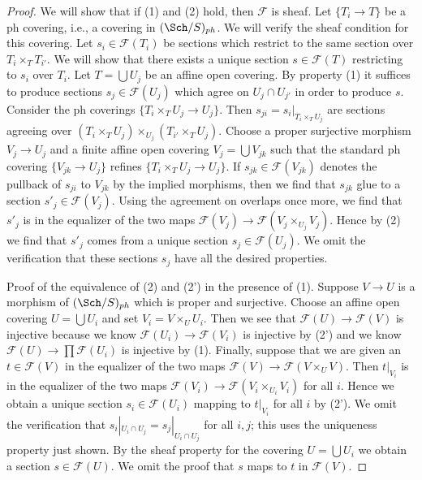 \begin{proof}
We will show that if (1) and (2) hold, then $\mathcal{F}$ is sheaf.
Let $\{T_i \to T\}$ be a ph covering, i.e., a covering in $(\Sch/S)_{ph}$.
We will verify the sheaf condition for this covering.
Let $s_i \in \mathcal{F}(T_i)$ be sections which restrict to the same
section over $T_i \times_T T_{i'}$. We will show that there exists a
unique section $s \in \mathcal{F}(T)$ restricting to $s_i$ over $T_i$.
Let $T = \bigcup U_j$ be an affine open covering.
By property (1) it suffices to produce sections $s_j \in \mathcal{F}(U_j)$
which agree on $U_j \cap U_{j'}$ in order to produce $s$.
Consider the ph coverings $\{T_i \times_T U_j \to U_j\}$.
Then $s_{ji} = s_i|_{T_i \times_T U_j}$ are sections agreeing
over $(T_i \times_T U_j) \times_{U_j} (T_{i'} \times_T U_j)$.
Choose a proper surjective morphism $V_j \to U_j$ and a finite affine
open covering $V_j = \bigcup V_{jk}$ such that the standard ph covering
$\{V_{jk} \to U_j\}$ refines $\{T_i \times_T U_j \to U_j\}$.
If $s_{jk} \in \mathcal{F}(V_{jk})$
denotes the pullback of $s_{ji}$ to $V_{jk}$ by the
implied morphisms, then we find that $s_{jk}$ glue to a section
$s'_j \in \mathcal{F}(V_j)$. Using the agreement on overlaps
once more, we find that $s'_j$ is in the equalizer of the two
maps $\mathcal{F}(V_j) \to \mathcal{F}(V_j \times_{U_j} V_j)$.
Hence by (2) we find that $s'_j$ comes from a unique section
$s_j \in \mathcal{F}(U_j)$. We omit the verification that these
sections $s_j$ have all the desired properties.

\medskip\noindent
Proof of the equivalence of (2) and (2') in the presence of (1).
Suppose $V \to U$ is a morphism of $(\Sch/S)_{ph}$ which is
proper and surjective. Choose an
affine open covering $U = \bigcup U_i$ and set $V_i = V \times_U U_i$.
Then we see that $\mathcal{F}(U) \to \mathcal{F}(V)$
is injective because we know $\mathcal{F}(U_i) \to \mathcal{F}(V_i)$
is injective by (2') and we know $\mathcal{F}(U) \to \prod \mathcal{F}(U_i)$
is injective by (1). Finally, suppose that we are given an
$t \in \mathcal{F}(V)$ in the equalizer of the two maps
$\mathcal{F}(V) \to \mathcal{F}(V \times_U V)$.
Then $t|_{V_i}$ is in the equalizer of the two maps
$\mathcal{F}(V_i) \to \mathcal{F}(V_i \times_{U_i} V_i)$
for all $i$. Hence we obtain a unique section $s_i \in \mathcal{F}(U_i)$
mapping to $t|_{V_i}$ for all $i$ by (2').
We omit the verification that $s_i|_{U_i \cap U_j} = s_j|_{U_i \cap U_j}$
for all $i, j$; this uses the uniqueness property just shown.
By the sheaf property for the covering $U = \bigcup U_i$ we obtain
a section $s \in \mathcal{F}(U)$. We omit the proof that $s$
maps to $t$ in $\mathcal{F}(V)$.
\end{proof}

